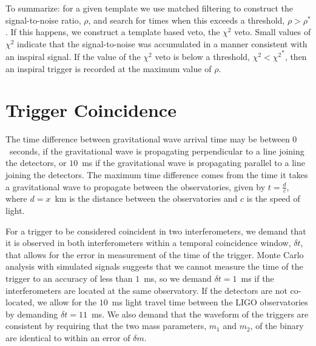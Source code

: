 To summarize: for a given template we use matched
filtering to construct the signal-to-noise ratio, $\rho$, and search for times
when this exceeds a threshold, $\rho > \rho^\ast$. If this happens, we
construct a template based veto, the $\chi^2$ veto\cite{brucechisq}. Small
values of $\chi^2$ indicate that the signal-to-noise was accumulated in a
manner consistent with an inspiral signal. If the value of the $\chi^2$ veto
is below a threshold, $\chi^2 < {\chi^2}^\ast$, then an inspiral trigger is
recorded at the maximum value of $\rho$.


\section{Trigger Coincidence}
\label{s:coincidence}

The time difference between gravitational wave arrival time
may be between $0$~seconds, if the gravitational wave is propagating
perpendicular to a line joining the detectors, or $10$~ms if the gravitational
wave is propagating parallel to a line joining the detectors. The maximum
time difference comes from the time it takes a gravitational wave to propagate
between the observatories, given by $t = \frac{d}{c}$, where $d = x$~km is the
distance between the observatories and $c$ is the speed of light.


For a trigger to be considered coincident in two interferometers, we demand
that it is observed in both interferometers within a temporal coincidence
window, $\delta t$, that allows for the error in measurement of the time of
the trigger. Monte Carlo analysis with simulated signals suggests that we
cannot measure the time of the trigger to an accuracy of less than $1$~ms, so
we demand $\delta t = 1$~ms if the interferometers are located at the same
observatory. If the detectors are not co-located, we allow for the $10$~ms
light travel time between the LIGO observatories by demanding $\delta t =
11$~ms. We also demand that the waveform of the triggers are consistent by
requiring that the two mass parameters, $m_1$ and $m_2$, of the binary are
identical to within an error of $\delta m$.


